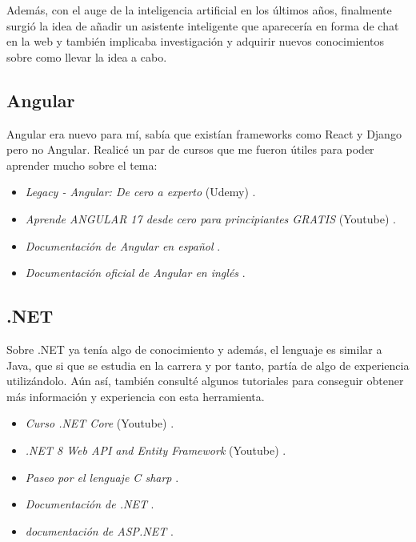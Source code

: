 Además, con el auge de la inteligencia artificial en los últimos años, finalmente surgió la idea de añadir un asistente inteligente que aparecería en forma de chat en la web y también implicaba investigación y adquirir nuevos conocimientos sobre como llevar la idea a cabo.

\subsection{Angular}

Angular era nuevo para mí, sabía que existían frameworks como React y Django pero no Angular. Realicé un par de cursos que me fueron útiles para poder aprender mucho sobre el tema:

\begin{itemize}
\tightlist
\item
  \emph{Legacy - Angular: De cero a experto} (Udemy)
  \cite{course:angular_legacy}.
\item
  \emph{Aprende ANGULAR 17 desde cero para principiantes GRATIS} (Youtube)
  \cite{course:angular_midudev}.
\item
  \emph{Documentación de Angular en español}
  \cite{web:angular_hispano}.
\item
  \emph{Documentación oficial de Angular en inglés}
  \cite{web:angular_oficial}.
\end{itemize}


\subsection{.NET}

Sobre .NET ya tenía algo de conocimiento y además, el lenguaje es similar a Java, que si que se estudia en la carrera y por tanto, partía de algo de experiencia utilizándolo. Aún así, también consulté algunos tutoriales para conseguir obtener más información y experiencia con esta herramienta.

\begin{itemize}
\tightlist
\item
  \emph{Curso .NET Core} (Youtube)
  \cite{web:curso-net}.
\item
  \emph{.NET 8 Web API and Entity Framework} (Youtube)
  \cite{web:net-web-api}.
\item
  \emph{Paseo por el lenguaje C sharp}
  \cite{web:net_tutorial}.
\item
  \emph{Documentación de .NET}
  \cite{web:net_documentacion}.
\item
  \emph{documentación de ASP.NET}
  \cite{web:net-asp}.
\end{itemize}


